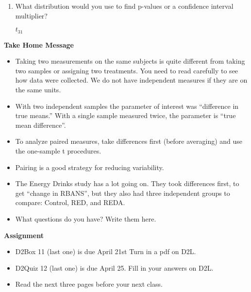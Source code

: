 \begin{enumerate}
\begin{enumerate}
\begin{key}
  {\it Take difference in weight gain (diet minus sugar) for each person.}
\end{key}
\item What distribution would you use to find p-values or
    a confidence interval multiplier?
\begin{students}
\vspace{2cm}
\end{students}

\begin{key}
  {\it $t_{31}$}
\end{key}
\end{enumerate}

\end{enumerate}


\begin{center}
  {\large\bf Take Home Message}
\end{center}
\begin{itemize}
\item Taking two measurements on the same subjects is quite different
  from taking two samples or assigning two treatments. You need to
  read carefully to see how data were collected.  We do not have
  independent measures if they are on the same units.

  \item With two independent samples the parameter of interest was
    ``difference in true means.''  With a single sample measured
    twice, the parameter is ``true mean difference''.

  \item To analyze paired measures, take differences first (before
    averaging) and use the one-sample t procedures.

  \item Pairing is a good strategy for reducing variability.

  \item The Energy Drinks study has a lot going on.  They took
    differences first, to get ``change in RBANS'', but they also had
    three independent groups to compare: Control, RED, and REDA.

  \item What  questions do you have?  Write them here.\vspace{2cm}
\end{itemize}



\begin{center}
  {\large\bf Assignment}
\end{center}

\begin{itemize}
\item D2Box 11 (last one) is due April 21st Turn in a pdf on D2L.
\item D2Quiz 12 (last one) is due April 25.  Fill in your answers on D2L.
\item Read the next three pages before your next class.
\end{itemize}
